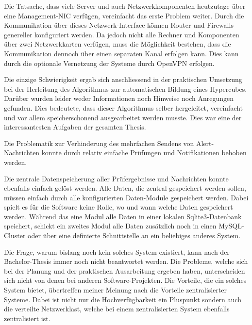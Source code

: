 Die Tatsache, dass viele Server und auch Netzwerkkomponenten heutzutage \"uber eine Management-NIC verf\"ugen, vereinfacht das erste Problem weiter. Durch die Kommunikation \"uber dieses Netzwerk-Interface k\"onnen Router und Firewalls genereller konfiguriert werden. Da jedoch nicht alle Rechner und Komponenten \"uber zwei Netzwerkkarten verf\"ugen, muss die M\"oglichkeit bestehen, dass die Kommunikation dennoch \"uber einen separaten Kanal erfolgen kann. Dies kann durch die optionale Vernetzung der Systeme durch OpenVPN erfolgen.

Die einzige Schwierigkeit ergab sich anschliessend in der praktischen Umsetzung bei der Herleitung des Algorithmus zur automatischen Bildung eines Hypercubes. Dar\"uber wurden leider weder Informationen noch Hinweise noch Anregungen gefunden. Dies bedeutete, dass dieser Algorithmus selber hergeleitet, vereinfacht und vor allem speicherschonend ausgearbeitet werden musste. Dies war eine der interessantesten Aufgaben der gesamten Thesis.

Die Problematik zur Verhinderung des mehrfachen Sendens von Alert-Nachrichten konnte durch relativ einfache Pr\"ufungen und Notifikationen behoben werden.

Die zentrale Datenspeicherung aller Pr\"ufergebnisse und Nachrichten konnte ebenfalls einfach gel\"ost werden. Alle Daten, die zentral gespeichert werden sollen, m\"ussen einfach durch alle konfigurierten Daten-Module gespeichert werden. Dabei spielt es f\"ur die Software keine Rolle, wo und wann welche Daten gespeichert werden. W\"ahrend das eine Modul alle Daten in einer lokalen Sqlite3-Datenbank speichert, schickt ein zweites Modul alle Daten zus\"atzlich noch in einen MySQL-Cluster oder \"uber eine definierte Schnittstelle an ein beliebiges anderes System.

Die Frage, warum bislang noch kein solches System existiert, kann nach der Bachelor-Thesis immer noch nicht beantwortet werden. Die Probleme, welche sich bei der Planung und der praktischen Ausarbeitung ergeben haben, unterscheiden sich nicht von denen bei anderen Software-Projekten. Die Vorteile, die ein solches System bietet, \"ubertreffen meiner Meinung nach die Vorteile zentralisierter Systeme. Dabei ist nicht nur die Hochverf\"ugbarkeit ein Pluspunkt sondern auch die verteilte Netzwerklast, welche bei einem zentralisierten System ebenfalls zentralisiert ist.



